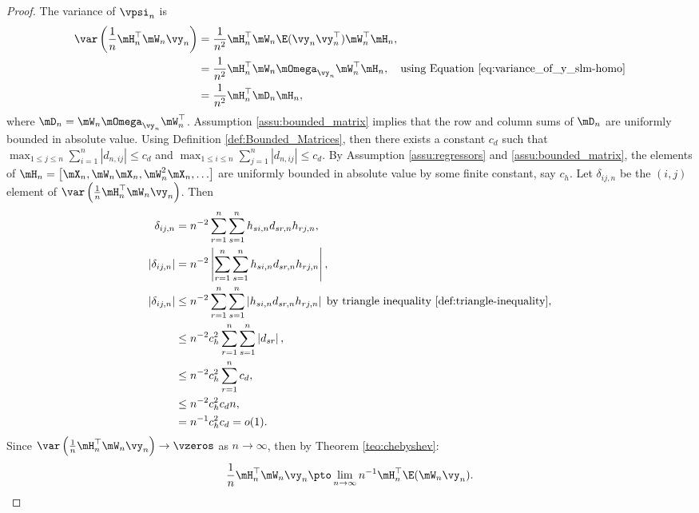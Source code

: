 \documentclass[english,12pt]{book}\usepackage[]{graphicx}\usepackage[]{xcolor}
\begin{document}
\begin{proof}
The variance of $\vpsi_n$ is 
\begin{equation*}
\begin{aligned}
\var\left(\frac{1}{n}\mH_n^\top\mW_n\vy_n\right) & = \frac{1}{n^2}\mH_n^\top\mW_n\E(\vy_n\vy_n^\top)\mW_n^\top\mH_n, \\
& = \frac{1}{n^2}\mH_n^\top\mW_n\mOmega_{\vy_n}\mW_n^\top\mH_n, \quad \mbox{using Equation \eqref{eq:variance_of_y_slm-homo}} \\
& = \frac{1}{n^2}\mH_n^\top\mD_n\mH_n,
\end{aligned}
\end{equation*}
%
where $\mD_n = \mW_n\mOmega_{\vy_n}\mW_n^\top$. 
Assumption \ref{assu:bounded_matrix} implies that the row and column sums of $\mD_n$ are uniformly bounded in absolute value. Using Definition \ref{def:Bounded_Matrices}, then there exists a constant $c_d$ such that $\max_{1 \leq j\leq n}\sum_{i = 1}^n\left|d_{n, ij}\right| \leq c_d$ and $\max_{1 \leq i\leq n}\sum_{j = 1}^n\left|d_{n, ij}\right| \leq c_d$. By Assumption \ref{assu:regressors} and \ref{assu:bounded_matrix}, the elements of $\mH_n = \left[\mX_n, \mW_n\mX_n, \mW_n^2\mX_n, \ldots \right]$ are uniformly bounded in absolute value by some finite constant, say $c_h$. Let $\delta_{ij,n}$ be the $(i,j)$ element of $\var\left(\frac{1}{n}\mH_n^\top\mW_n\vy_n\right)$. Then
  \begin{equation*}
    \begin{aligned}
      \delta_{ij,n} & = n^{-2}\sum_{r = 1}^n\sum_{s = 1}^n h_{si,n}d_{sr,n}h_{rj,n}, \\
      \left|\delta_{ij, n}\right| & = n^{-2}\left|\sum_{r = 1}^n\sum_{s = 1}^n h_{si,n}d_{sr,n}h_{rj,n}\right|, \\
      \left|\delta_{ij, n}\right| & \leq n^{-2}\sum_{r = 1}^n\sum_{s = 1}^n \left|h_{si,n}d_{sr,n}h_{rj,n}\right| \; \mbox{by triangle inequality \ref{def:triangle-inequality}}, \\
       & \leq n^{-2}c_h^2\sum_{r = 1}^n\sum_{s = 1}^n  \left|d_{sr}\right|, \\
        & \leq n^{-2}c_h^2\sum_{r = 1}^n c_d, \\
        & \leq n^{-2}c_h^2c_dn, \\
        & = n^{-1}c_h^2c_d = o(1).
    \end{aligned}
  \end{equation*}
Since $\var\left(\frac{1}{n}\mH_n^\top\mW_n\vy_n\right)\to \vzeros$ as $n\to\infty$, then by Theorem \ref{teo:chebyshev}:
\begin{equation*}
\frac{1}{n}\mH_n^\top\mW_n\vy_n\pto \lim_{n\to\infty}n^{-1}\mH_n^\top\E(\mW_n\vy_n).
\end{equation*}
\end{proof}
\end{document}
